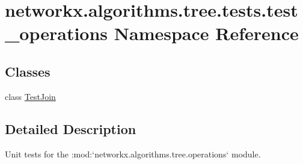 \hypertarget{namespacenetworkx_1_1algorithms_1_1tree_1_1tests_1_1test__operations}{}\section{networkx.\+algorithms.\+tree.\+tests.\+test\+\_\+operations Namespace Reference}
\label{namespacenetworkx_1_1algorithms_1_1tree_1_1tests_1_1test__operations}
\subsection*{Classes}
\begin{DoxyCompactItemize}
\item 
class \hyperlink{classnetworkx_1_1algorithms_1_1tree_1_1tests_1_1test__operations_1_1TestJoin}{Test\+Join}
\end{DoxyCompactItemize}


\subsection{Detailed Description}
\begin{DoxyVerb}Unit tests for the :mod:`networkx.algorithms.tree.operations` module.\end{DoxyVerb}
 